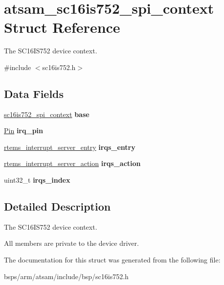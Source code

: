 \hypertarget{structatsam__sc16is752__spi__context}{}\section{atsam\+\_\+sc16is752\+\_\+spi\+\_\+context Struct Reference}
\label{structatsam__sc16is752__spi__context}


The S\+C16\+I\+S752 device context.  




{\ttfamily \#include $<$sc16is752.\+h$>$}

\subsection*{Data Fields}
\begin{DoxyCompactItemize}
\item 
\mbox{\label{structatsam__sc16is752__spi__context_a13f497ca4d402beb7ccb6e59b85b0c4f}} 
\mbox{\hyperlink{structsc16is752__spi__context}{sc16is752\+\_\+spi\+\_\+context}} {\bfseries base}
\item 
\mbox{\label{structatsam__sc16is752__spi__context_ac1d4e077093e5a4c39c8b23d3c4ad38f}} 
\mbox{\hyperlink{struct__Pin}{Pin}} {\bfseries irq\+\_\+pin}
\item 
\mbox{\label{structatsam__sc16is752__spi__context_a526cc5127c37bd232cda8a04dfcaf8a9}} 
\mbox{\hyperlink{structrtems__interrupt__server__entry}{rtems\+\_\+interrupt\+\_\+server\+\_\+entry}} {\bfseries irqs\+\_\+entry}
\item 
\mbox{\label{structatsam__sc16is752__spi__context_a2b6aa3a1bdda8a290c3c8cf58840dad4}} 
\mbox{\hyperlink{structrtems__interrupt__server__action}{rtems\+\_\+interrupt\+\_\+server\+\_\+action}} {\bfseries irqs\+\_\+action}
\item 
\mbox{\label{structatsam__sc16is752__spi__context_a938a6e250e268e06a828de1758c08cad}} 
uint32\+\_\+t {\bfseries irqs\+\_\+index}
\end{DoxyCompactItemize}


\subsection{Detailed Description}
The S\+C16\+I\+S752 device context. 

All members are private to the device driver. 

The documentation for this struct was generated from the following file\+:\begin{DoxyCompactItemize}
\item 
bsps/arm/atsam/include/bsp/sc16is752.\+h\end{DoxyCompactItemize}
